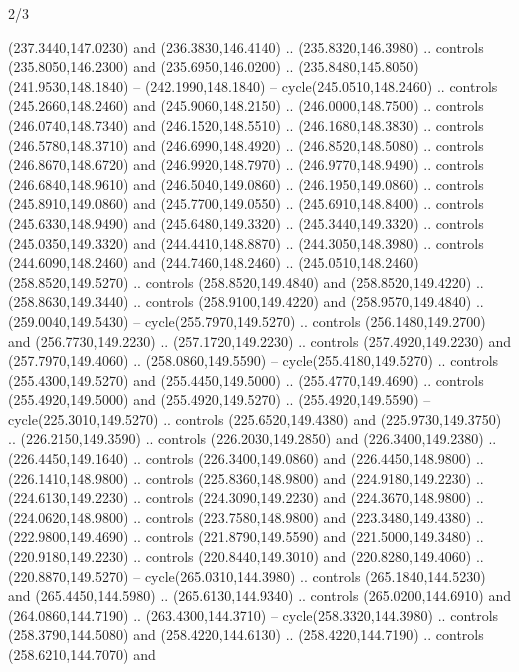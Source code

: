 \begin{flagdescription}{2/3}
\begin{scope}[xshift=0.5\flaglength,yshift=0.5\flagwidth,scale=\flagwidth/259.2]
\begin{scope}[y=0.8pt, x=0.8pt, yscale=-1,shift={(-243,-162)}]
      (237.3440,147.0230) and (236.3830,146.4140) .. (235.8320,146.3980) .. controls
      (235.8050,146.2300) and (235.6950,146.0200) ..
      (235.8480,145.8050)(241.9530,148.1840) -- (242.1990,148.1840) --
      cycle(245.0510,148.2460) .. controls (245.2660,148.2460) and
      (245.9060,148.2150) .. (246.0000,148.7500) .. controls (246.0740,148.7340) and
      (246.1520,148.5510) .. (246.1680,148.3830) .. controls (246.5780,148.3710) and
      (246.6990,148.4920) .. (246.8520,148.5080) .. controls (246.8670,148.6720) and
      (246.9920,148.7970) .. (246.9770,148.9490) .. controls (246.6840,148.9610) and
      (246.5040,149.0860) .. (246.1950,149.0860) .. controls (245.8910,149.0860) and
      (245.7700,149.0550) .. (245.6910,148.8400) .. controls (245.6330,148.9490) and
      (245.6480,149.3320) .. (245.3440,149.3320) .. controls (245.0350,149.3320) and
      (244.4410,148.8870) .. (244.3050,148.3980) .. controls (244.6090,148.2460) and
      (244.7460,148.2460) .. (245.0510,148.2460)(258.8520,149.5270) .. controls
      (258.8520,149.4840) and (258.8520,149.4220) .. (258.8630,149.3440) .. controls
      (258.9100,149.4220) and (258.9570,149.4840) .. (259.0040,149.5430) --
      cycle(255.7970,149.5270) .. controls (256.1480,149.2700) and
      (256.7730,149.2230) .. (257.1720,149.2230) .. controls (257.4920,149.2230) and
      (257.7970,149.4060) .. (258.0860,149.5590) -- cycle(255.4180,149.5270) ..
      controls (255.4300,149.5270) and (255.4450,149.5000) .. (255.4770,149.4690) ..
      controls (255.4920,149.5000) and (255.4920,149.5270) .. (255.4920,149.5590) --
      cycle(225.3010,149.5270) .. controls (225.6520,149.4380) and
      (225.9730,149.3750) .. (226.2150,149.3590) .. controls (226.2030,149.2850) and
      (226.3400,149.2380) .. (226.4450,149.1640) .. controls (226.3400,149.0860) and
      (226.4450,148.9800) .. (226.1410,148.9800) .. controls (225.8360,148.9800) and
      (224.9180,149.2230) .. (224.6130,149.2230) .. controls (224.3090,149.2230) and
      (224.3670,148.9800) .. (224.0620,148.9800) .. controls (223.7580,148.9800) and
      (223.3480,149.4380) .. (222.9800,149.4690) .. controls (221.8790,149.5590) and
      (221.5000,149.3480) .. (220.9180,149.2230) .. controls (220.8440,149.3010) and
      (220.8280,149.4060) .. (220.8870,149.5270) -- cycle(265.0310,144.3980) ..
      controls (265.1840,144.5230) and (265.4450,144.5980) .. (265.6130,144.9340) ..
      controls (265.0200,144.6910) and (264.0860,144.7190) .. (263.4300,144.3710) --
      cycle(258.3320,144.3980) .. controls (258.3790,144.5080) and
      (258.4220,144.6130) .. (258.4220,144.7190) .. controls (258.6210,144.7070) and

\end{scope}
\end{scope}
\end{flagdescription}
